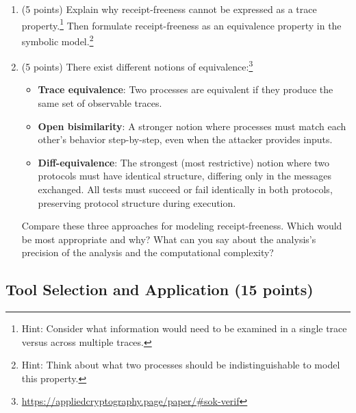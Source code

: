 \documentclass[10pt,a4paper,american]{exam}
\begin{document}
\begin{enumerate}
	      \begin{enumerate}
		      \item (5 points) Explain why receipt-freeness cannot be expressed as a trace property.\footnote{Hint: Consider what information would need to be examined in a single trace versus across multiple traces.} Then formulate receipt-freeness as an equivalence property in the symbolic model.\footnote{Hint: Think about what two processes should be indistinguishable to model this property.}
		      \item (5 points) There exist different notions of equivalence:\footnote{\url{https://appliedcryptography.page/paper/\#sok-verif}}
		            \begin{itemize}
			            \item \textbf{Trace equivalence}: Two processes are equivalent if they produce the same set of observable traces.
			            \item \textbf{Open bisimilarity}: A stronger notion where processes must match each other's behavior step-by-step, even when the attacker provides inputs.
			            \item \textbf{Diff-equivalence}: The strongest (most restrictive) notion where two protocols must have identical structure, differing only in the messages exchanged. All tests must succeed or fail identically in both protocols, preserving protocol structure during execution.
		            \end{itemize}
		            Compare these three approaches for modeling receipt-freeness. Which would be most appropriate and why? What can you say about the analysis's precision of the analysis and the computational complexity?
	      \end{enumerate}
\end{enumerate}

\subsection{Tool Selection and Application (15 points)}
\end{document}
